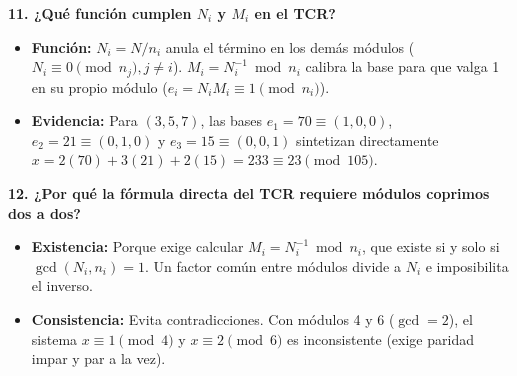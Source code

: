 \smallskip
\noindent\textbf{11. ¿Qué función cumplen \texorpdfstring{$N_i$}{Ni} y \texorpdfstring{$M_i$}{Mi} en el TCR?}
\begin{itemize}\setlength\itemsep{0pt}\setlength\parskip{0pt}
    \item \textbf{Función:} $N_i = N/n_i$ anula el término en los demás módulos ($N_i \equiv 0 \pmod{n_j}, j \neq i$). $M_i = N_i^{-1} \bmod n_i$ calibra la base para que valga 1 en su propio módulo ($e_i = N_i M_i \equiv 1 \pmod{n_i}$).
    \item \textbf{Evidencia:} Para $(3, 5, 7)$, las bases $e_1 = 70 \equiv (1, 0, 0)$, $e_2 = 21 \equiv (0, 1, 0)$ y $e_3 = 15 \equiv (0, 0, 1)$ sintetizan directamente $x = 2(70) + 3(21) + 2(15) = 233 \equiv 23 \pmod{105}$.
\end{itemize}

\smallskip
\noindent\textbf{12. ¿Por qué la fórmula directa del TCR requiere módulos coprimos dos a dos?}
\begin{itemize}\setlength\itemsep{0pt}\setlength\parskip{0pt}
    \item \textbf{Existencia:} Porque exige calcular $M_i = N_i^{-1} \bmod n_i$, que existe si y solo si $\gcd(N_i, n_i) = 1$. Un factor común entre módulos divide a $N_i$ e imposibilita el inverso.
    \item \textbf{Consistencia:} Evita contradicciones. Con módulos 4 y 6 ($\gcd = 2$), el sistema $x \equiv 1 \pmod 4$ y $x \equiv 2 \pmod 6$ es inconsistente (exige paridad impar y par a la vez).
\end{itemize}
